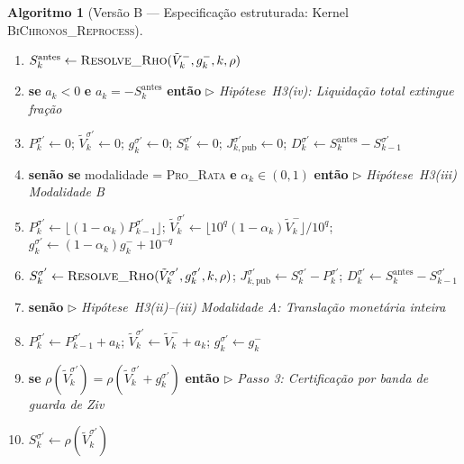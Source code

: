 \documentclass[11pt, a4paper]{article}
\theoremstyle{definition}
\newtheorem{algoritmo}[definicao]{Algoritmo}
\theoremstyle{plain}
\theoremstyle{remark}
\begin{document}
\begin{algoritmo}[Versão B — Especificação estruturada: Kernel \textsc{BiChronos\_Reprocess}]
\begin{enumerate}[label=\footnotesize\textbf{\arabic*:}, leftmargin=2.2em, itemsep=0.15em, topsep=0.3em]
    \item \hspace{1.2em} $S_k^{\text{antes}} \leftarrow \textsc{Resolve\_Rho}(\tilde{V}_k^-, g_k^-, k, \rho)$
    \item \hspace{1.2em} \textbf{se} $a_k < 0$ \textbf{e} $a_k = -S_k^{\text{antes}}$ \textbf{então} \hfill $\triangleright$ \emph{Hipótese~H3(iv): Liquidação total extingue fração}
    \item \hspace{2.4em} $P_k^{\sigma'} \leftarrow 0$; \quad $\tilde{V}_k^{\sigma'} \leftarrow 0$; \quad $g_k^{\sigma'} \leftarrow 0$; \quad $S_k^{\sigma'} \leftarrow 0$; \quad $J_{k,\text{pub}}^{\sigma'} \leftarrow 0$; \quad $D_k^{\sigma'} \leftarrow S_k^{\text{antes}} - S_{k-1}^{\sigma'}$
    \item \hspace{1.2em} \textbf{senão se} modalidade = \textsc{Pro\_Rata} \textbf{e} $\alpha_k \in (0, 1)$ \textbf{então} \hfill $\triangleright$ \emph{Hipótese~H3(iii) Modalidade B}
    \item \hspace{2.4em} $P_k^{\sigma'} \leftarrow \lfloor (1 - \alpha_k) P_{k-1}^{\sigma'} \rfloor$; \quad $\tilde{V}_k^{\sigma'} \leftarrow \lfloor 10^q (1 - \alpha_k)\tilde{V}_k^- \rfloor / 10^q$; \quad $g_k^{\sigma'} \leftarrow (1 - \alpha_k)g_k^- + 10^{-q}$
    \item \hspace{2.4em} $S_k^{\sigma'} \leftarrow \textsc{Resolve\_Rho}(\tilde{V}_k^{\sigma'}, g_k^{\sigma'}, k, \rho)$; \quad $J_{k,\text{pub}}^{\sigma'} \leftarrow S_k^{\sigma'} - P_k^{\sigma'}$; \quad $D_k^{\sigma'} \leftarrow S_k^{\text{antes}} - S_{k-1}^{\sigma'}$
    \item \hspace{1.2em} \textbf{senão} \hfill $\triangleright$ \emph{Hipótese~H3(ii)--(iii) Modalidade A: Translação monetária inteira}
    \item \hspace{2.4em} $P_k^{\sigma'} \leftarrow P_{k-1}^{\sigma'} + a_k$; \quad $\tilde{V}_k^{\sigma'} \leftarrow \tilde{V}_k^- + a_k$; \quad $g_k^{\sigma'} \leftarrow g_k^-$
    \item \hspace{2.4em} \textbf{se} $\rho(\tilde{V}_k^{\sigma'}) = \rho(\tilde{V}_k^{\sigma'} + g_k^{\sigma'})$ \textbf{então} \hfill $\triangleright$ \emph{Passo 3: Certificação por banda de guarda de Ziv}
    \item \hspace{3.6em} $S_k^{\sigma'} \leftarrow \rho(\tilde{V}_k^{\sigma'})$

\end{enumerate}
\end{algoritmo}
\end{document}
